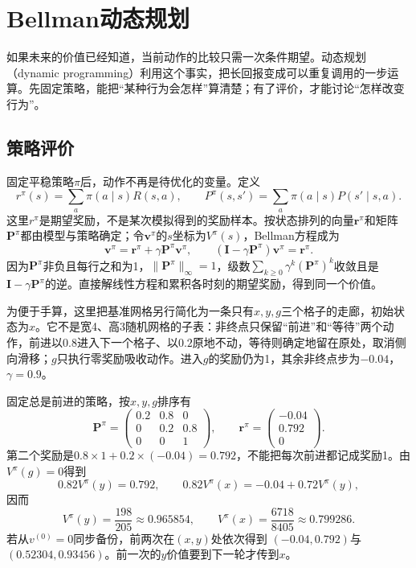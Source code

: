 \section{Bellman动态规划}
\label{sec:rl-planning-dp}

如果未来的价值已经知道，当前动作的比较只需一次条件期望。动态规划（dynamic programming）利用这个事实，把长回报变成可以重复调用的一步运算。先固定策略，能把“某种行为会怎样”算清楚；有了评价，才能讨论“怎样改变行为”。

\subsection{策略评价}
\label{sec:rl-planning-evaluation}

固定平稳策略$\pi$后，动作不再是待优化的变量。定义
\[
 r^\pi(s)=\sum_a\pi(a\mid s)R(s,a),\qquad
 P^\pi(s,s')=\sum_a\pi(a\mid s)P(s'\mid s,a).
\]
这里$r^\pi$是期望奖励，不是某次模拟得到的奖励样本。按状态排列的向量$\bm r^\pi$和矩阵$\bm P^\pi$都由模型与策略确定；令$\bm v^\pi$的$s$坐标为$V^\pi(s)$，Bellman方程成为
\begin{equation}
 \bm v^\pi=\bm r^\pi+\gamma\bm P^\pi\bm v^\pi,\qquad
 (\bm I-\gamma\bm P^\pi)\bm v^\pi=\bm r^\pi.
 \label{eq:rl-planning-linear-evaluation}
\end{equation}
因为$\bm P^\pi$非负且每行之和为1，$\lVert\bm P^\pi\rVert_\infty=1$，级数$\sum_{k\geq0}\gamma^k(\bm P^\pi)^k$收敛且是$\bm I-\gamma\bm P^\pi$的逆。直接解线性方程和累积各时刻的期望奖励，得到同一个价值。

\begin{example}[三个格子的独立手算模型]
 \label{ex:rl-planning-corridor}
 为便于手算，这里把基准网格另行简化为一条只有$x,y,g$三个格子的走廊，初始状态为$x$。它不是宽4、高3随机网格的子表：非终点只保留“前进”和“等待”两个动作，前进以$0.8$进入下一个格子、以$0.2$原地不动，等待则确定地留在原处，取消侧向滑移；$g$只执行零奖励吸收动作。进入$g$的奖励仍为1，其余非终点步为$-0.04$，$\gamma=0.9$。

 固定总是前进的策略，按$x,y,g$排序有
 \[
 \bm P^\pi=
 \begin{pmatrix}0.2&0.8&0\\0&0.2&0.8\\0&0&1\end{pmatrix},
 \qquad
 \bm r^\pi=\begin{pmatrix}-0.04\\0.792\\0\end{pmatrix}.
 \]
 第二个奖励是$0.8\times1+0.2\times(-0.04)=0.792$，不能把每次前进都记成奖励1。由$V^\pi(g)=0$得到
 \[
 0.82V^\pi(y)=0.792,\qquad
 0.82V^\pi(x)=-0.04+0.72V^\pi(y),
 \]
 因而
 \[
 V^\pi(y)=\frac{198}{205}\approx0.965854,\qquad
 V^\pi(x)=\frac{6718}{8405}\approx0.799286.
 \]
 若从$v^{(0)}=0$同步备份，前两次在$(x,y)$处依次得到
 $(-0.04,0.792)$与$(0.52304,0.93456)$。前一次的$y$价值要到下一轮才传到$x$。
\end{example}

